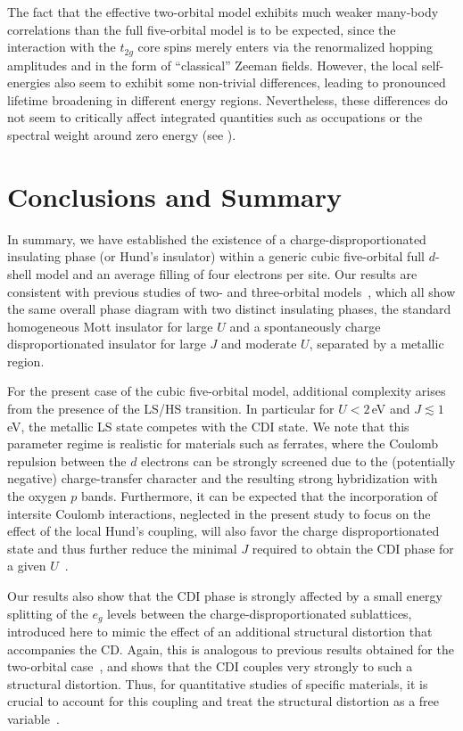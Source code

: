 \documentclass[aps,prb,twocolumn,superscriptaddress,10pt]{revtex4-1}
\newcommand{\pref}[1]{\prettyref{#1}}%
\begin{document}
The fact that the effective two-orbital model exhibits much weaker many-body correlations than the full five-orbital model is to be expected, since the interaction with the $t_{2g}$ core spins merely enters via the renormalized hopping amplitudes and in the form of ``classical'' Zeeman fields. However, the local self-energies also seem to exhibit some non-trivial differences, leading to pronounced lifetime broadening in different energy regions. Nevertheless, these differences do not seem to critically affect integrated quantities such as occupations or the spectral weight around zero energy (see \pref{fig:characteristics_eff2_noBM_fullBW_version2}).

\section{Conclusions and Summary}

In summary, we have established the existence of a charge-disproportionated insulating phase (or Hund's insulator) within a generic cubic five-orbital full $d$-shell model and an average filling of four electrons per site. Our results are consistent with previous studies of two- and three-orbital models~\cite{subedi_low-energy_2015, isidori_charge_2019}, which all show the same overall phase diagram with two distinct insulating phases, the standard homogeneous Mott insulator for large $U$ and a spontaneously charge disproportionated insulator for large $J$ and moderate $U$, separated by a metallic region.

For the present case of the cubic five-orbital model, additional complexity arises from the presence of the LS/HS transition. In particular for $U<2$\,eV and $J\lesssim 1$\,eV, the metallic LS state competes with the CDI state. We note that this parameter regime is realistic for materials such as ferrates, where the Coulomb repulsion between the $d$ electrons can be strongly screened due to the (potentially negative) charge-transfer character and the resulting strong hybridization with the oxygen $p$ bands. 
%
Furthermore, it can be expected that the incorporation of intersite Coulomb interactions, neglected in the present study to focus on the effect of the local Hund's coupling, will also favor the charge disproportionated state and thus further reduce the minimal $J$ required to obtain the CDI phase for a given $U$~\cite{seth_renormalization_2017}.

Our results also show that the CDI phase is strongly affected by a small energy splitting of the $e_g$ levels between the charge-disproportionated sublattices, introduced here to mimic the effect of an additional structural distortion that accompanies the CD. Again, this is analogous to previous results obtained for the two-orbital case~\cite{subedi_low-energy_2015}, and shows that the CDI couples very strongly to such a structural distortion. Thus, for quantitative studies of specific materials, it is crucial to account for this coupling and treat the structural distortion as a free variable~\cite{peil_mechanism_2019}.
\end{document}
